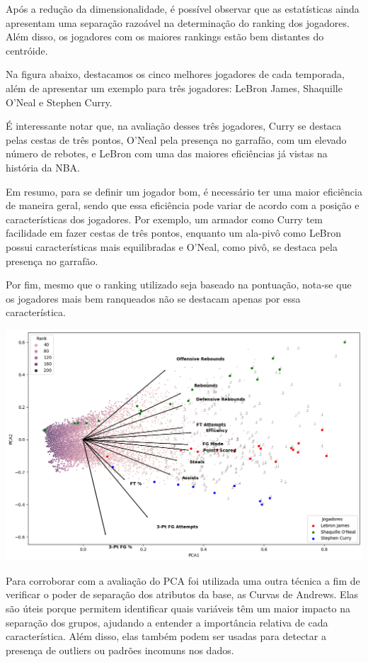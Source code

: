 \documentclass[
]{book}
\begin{document}
Após a redução da dimensionalidade, é possível observar que as estatísticas ainda apresentam uma separação razoável na determinação do ranking dos jogadores. Além disso, os jogadores com os maiores rankings estão bem distantes do centróide.

Na figura abaixo, destacamos os cinco melhores jogadores de cada temporada, além de apresentar um exemplo para três jogadores: LeBron James, Shaquille O'Neal e Stephen Curry.

É interessante notar que, na avaliação desses três jogadores, Curry se destaca pelas cestas de três pontos, O'Neal pela presença no garrafão, com um elevado número de rebotes, e LeBron com uma das maiores eficiências já vistas na história da NBA.

Em resumo, para se definir um jogador bom, é necessário ter uma maior eficiência de maneira geral, sendo que essa eficiência pode variar de acordo com a posição e características dos jogadores. Por exemplo, um armador como Curry tem facilidade em fazer cestas de três pontos, enquanto um ala-pivô como LeBron possui características mais equilibradas e O'Neal, como pivô, se destaca pela presença no garrafão.

Por fim, mesmo que o ranking utilizado seja baseado na pontuação, nota-se que os jogadores mais bem ranqueados não se destacam apenas por essa característica.

\includegraphics{imagens/6.png}

Para corroborar com a avaliação do PCA foi utilizada uma outra técnica a fim de verificar o poder de separação dos atributos da base, as Curvas de Andrews.
Elas são úteis porque permitem identificar quais variáveis têm um maior impacto na separação dos grupos, ajudando a entender a importância relativa de cada característica. Além disso, elas também podem ser usadas para detectar a presença de outliers ou padrões incomuns nos dados.
\end{document}
